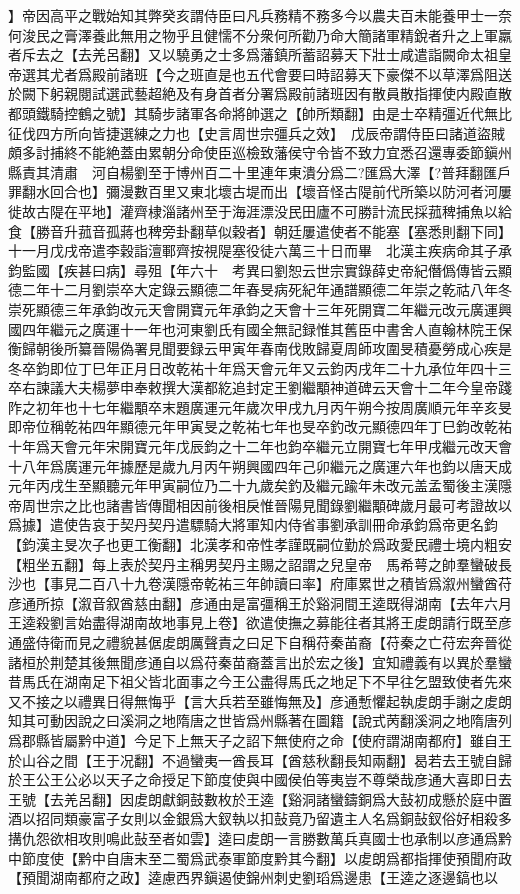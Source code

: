 】帝因高平之戰始知其弊癸亥謂侍臣曰凡兵務精不務多今以農夫百未能養甲士一奈何浚民之膏澤養此無用之物乎且健懦不分衆何所勸乃命大簡諸軍精銳者升之上軍羸者斥去之【去羌呂翻】又以驍勇之士多爲藩鎮所蓄詔募天下壯士咸遣詣闕命太祖皇帝選其尤者爲殿前諸班【今之班直是也五代會要曰時詔募天下豪傑不以草澤爲阻送於闕下躬親閱試選武藝超絶及有身首者分署爲殿前諸班因有散員散指揮使内殿直散都頭鐵騎控鶴之號】其騎步諸軍各命將帥選之【帥所類翻】由是士卒精彊近代無比征伐四方所向皆捷選練之力也【史言周世宗彊兵之效】　戊辰帝謂侍臣曰諸道盜賊頗多討捕終不能絶蓋由累朝分命使臣巡檢致藩侯守令皆不致力宜悉召還專委節鎭州縣責其清肅　河自楊劉至于博州百二十里連年東潰分爲二?匯爲大澤【?普拜翻匯戶罪翻水回合也】彌漫數百里又東北壞古堤而出【壞音怪古隄前代所築以防河者河屢徙故古隄在平地】灌齊棣淄諸州至于海涯漂没民田廬不可勝計流民採菰稗捕魚以給食【勝音升菰音孤蔣也稗旁卦翻草似穀者】朝廷屢遣使者不能塞【塞悉則翻下同】十一月戊戌帝遣李穀詣澶鄆齊按視隄塞役徒六萬三十日而畢　北漢主疾病命其子承鈞監國【疾甚曰病】尋殂【年六十　考異曰劉恕云世宗實錄薛史帝紀僭僞傳皆云顯德二年十二月劉崇卒大定錄云顯德二年春旻病死紀年通譜顯德二年崇之乾祜八年冬崇死顯德三年承鈞改元天會開寶元年承鈞之天會十三年死開寶二年繼元改元廣運興國四年繼元之廣運十一年也河東劉氏有國全無記録惟其舊臣中書舍人直翰林院王保衡歸朝後所纂晉陽偽署見聞要録云甲寅年春南伐敗歸夏周師攻圍旻積憂勞成心疾是冬卒鈞即位丁巳年正月日改乾祐十年爲天會元年又云鈞丙戌年二十九承位年四十三卒右諫議大夫楊夢申奉敕撰大漢都紇追封定王劉繼顒神道碑云天會十二年今皇帝踐阼之初年也十七年繼顒卒末題廣運元年歲次甲戌九月丙午朔今按周廣順元年辛亥旻即帝位稱乾祐四年顯德元年甲寅旻之乾祐七年也旻卒釣改元顯德四年丁巳鈞改乾祐十年爲天會元年宋開寶元年戊辰鈞之十二年也鈞卒繼元立開寶七年甲戌繼元改天會十八年爲廣運元年據歷是歲九月丙午朔興國四年己卯繼元之廣運六年也鈞以唐天成元年丙戌生至顯聽元年甲寅嗣位乃二十九歲矣釣及繼元踰年未改元盖孟蜀後主漢隱帝周世宗之比也諸書皆傳聞相因前後相戾惟晉陽見聞錄劉繼顒碑歲月最可考證故以爲據】遣使告哀于契丹契丹遣驃騎大將軍知内侍省事劉承訓冊命承鈞爲帝更名鈞【鈞漢主旻次子也更工衡翻】北漢孝和帝性孝謹既嗣位勤於爲政愛民禮士境内粗安【粗坐五翻】每上表於契丹主稱男契丹主賜之詔謂之兒皇帝　馬希萼之帥羣蠻破長沙也【事見二百八十九卷漢隱帝乾祐三年帥讀曰率】府庫累世之積皆爲溆州蠻酋苻彦通所掠【溆音叙酋慈由翻】彦通由是富彊稱王於谿洞間王逵既得湖南【去年六月王逵殺劉言始盡得湖南故地事見上卷】欲遣使撫之募能往者其將王䖍朗請行既至彦通盛侍衛而見之禮貌甚倨䖍朗厲聲責之曰足下自稱苻秦苖裔【苻秦之亡苻宏奔晉從諸桓於荆楚其後無聞彦通自以爲苻秦苗裔蓋言出於宏之後】宜知禮義有以異於羣蠻昔馬氏在湖南足下祖父皆北面事之今王公盡得馬氏之地足下不早往乞盟致使者先來又不接之以禮異日得無悔乎【言大兵若至雖悔無及】彦通慙懼起執䖍朗手謝之䖍朗知其可動因說之曰溪洞之地隋唐之世皆爲州縣著在圖籍【說式苪翻溪洞之地隋唐列爲郡縣皆屬黔中道】今足下上無天子之詔下無使府之命【使府謂湖南都府】雖自王於山谷之間【王于况翻】不過蠻夷一酋長耳【酋慈秋翻長知兩翻】曷若去王號自歸於王公王公必以天子之命授足下節度使與中國侯伯等夷豈不尊榮哉彦通大喜即日去王號【去羌呂翻】因䖍朗獻銅鼓數枚於王逵【谿洞諸蠻鑄銅爲大鼔初成懸於庭中置酒以招同類豪富子女則以金銀爲大釵執以扣鼔竟乃留遺主人名爲銅鼔釵俗好相殺多搆仇怨欲相攻則鳴此鼔至者如雲】逵曰䖍朗一言勝數萬兵真國士也承制以彦通爲黔中節度使【黔中自唐末至二蜀爲武泰軍節度黔其今翻】以䖍朗爲都指揮使預聞府政【預聞湖南都府之政】逵慮西界鎭遏使錦州刺史劉瑫爲邊患【王逵之逐邊鎬也以